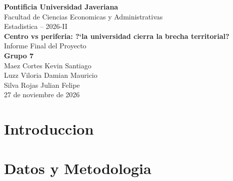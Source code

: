 \documentclass[11pt, a4paper]{article}
\begin{document}
\begin{center}
{\Large \textbf{Pontificia Universidad Javeriana}}\\[0.3cm]
Facultad de Ciencias Economicas y Administrativas\\[0.3cm]
Estadistica -- 2026-II\\[1cm]
{\LARGE \textbf{Centro vs periferia: ?`la universidad cierra la brecha territorial?}}\\[0.5cm]
{\large Informe Final del Proyecto}\\[1cm]
\textbf{Grupo 7}\\[0.3cm]
Maez Cortes Kevin Santiago\\
Luzz Viloria Damian Mauricio\\
Silva Rojas Julian Felipe\\[1cm]
27 de noviembre de 2026
\end{center}

\newpage
\tableofcontents
\newpage

\section{Introduccion}

\section{Datos y Metodologia}
\end{document}
